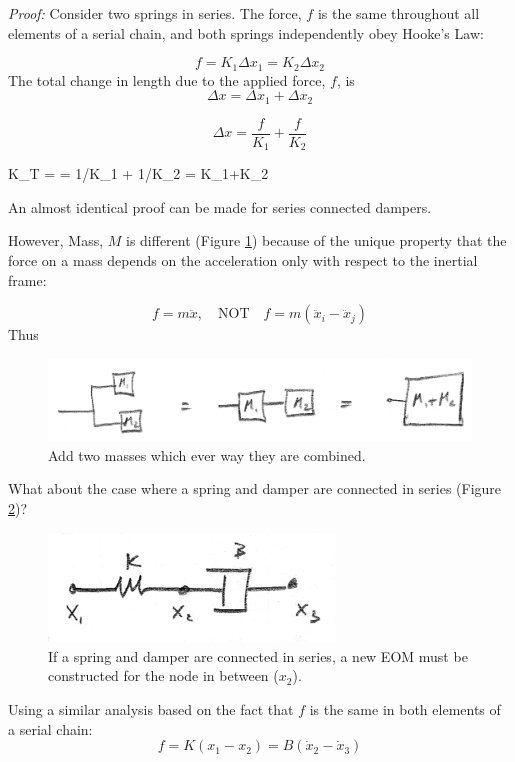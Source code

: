 {\it Proof:}
Consider two springs in series.
The force, $f$ is the same throughout all elements of a serial chain, and both springs independently obey Hooke's Law:

\[
f = K_1\Delta x_1 = K_2\Delta x_2
\]
The total change in length due to the applied force, $f$, is
\[
\Delta x = \Delta x_1 + \Delta x_2
\]

\[
\Delta x = \frac{f}{K_1} + \frac{f}{K_2}
\]

\bq
K_T =  =   {1/K_1 + 1/K_2} =  {K_1+K_2}
\eq

An almost identical proof can be made for series connected dampers.

However, Mass, $M$ is different (Figure \ref{addtwomasses}) because of the unique property that the force on a mass depends on the acceleration only with respect to the inertial frame:

\[
f = m\ddot{x}, \quad \mathrm{NOT} \quad f = m(\ddot{x}_i - \ddot{x}_j)
\]
Thus


\begin{figure}[h]\centering
\includegraphics[width=4.5in]{figs02/00724a.png}
\caption{Add two masses which ever way they are combined.}\label{addtwomasses}
\end{figure}

What about the case where a spring and damper are connected in series (Figure \ref{springseriesdamper})?


\begin{figure}\centering
\includegraphics[width=3.0in]{figs02/00725a.png}
\caption{If a spring and damper are connected in series, a new EOM must be constructed for the node in between ($x_2$).}\label{springseriesdamper}
\end{figure}

Using a similar analysis based on the fact that $f$ is the same in both elements of a serial chain:
\[
f = K(x_1-x_2) = B(\dot{x}_2-\dot{x}_3)
\]

